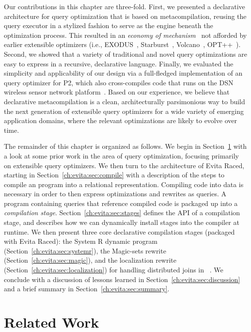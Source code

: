 Our contributions in this chapter are three-fold.  First, we presented a declarative
architecture for query optimization that is based on metacompilation, reusing
the query executor in a stylized fashion to serve as the engine beneath the
optimization process.  This resulted in an {\em economy of
mechanism}~\cite{Saltzer75theprotection} not afforded by earlier extensible
optimizers (i.e., EXODUS~\cite{exodus}, Starburst~\cite{phh92},
Volcano~\cite{volcano}, OPT++~\cite{opt++}).  Second, we showed that a variety
of traditional and novel query optimizations are easy to express in a
recursive, declarative language.  Finally, we evaluated the simplicity and
applicability of our design via a full-fledged implementation of an \OVERLOG
query optimizer for P2, which also cross-compiles code that runs on the DSN
wireless sensor network platform~\cite{chu-sensys07}.  Based on our experience,
we believe that declarative metacompilation is a clean, architecturally
parsimonious way to build the next generation of extensible query optimizers
for a wide variety of emerging application domains, where the relevant
optimizations are likely to evolve over time.

The remainder of this chapter is organized as follows.  We begin in
Section~\ref{ch:evita:sec:related} with a look at some prior work in the area
of query optimization, focusing primarily on extensible query optimizers.  We
then turn to the architecture of Evita Raced, starting in
Section~\ref{ch:evita:sec:compile} with a description of the steps to compile
an \OVERLOG program into a relational representation.  Compiling code into data
is necessary in order to then express optimizations and rewrites as queries.  A
program containing queries that reference compiled code is packaged up into a
{\em compilation stage}.  Section~\ref{ch:evita:sec:stages} defines the API of
a compilation stage, and describes how we can dynamically install stages into
the compiler at runtime.  We then present three core declarative compilation
stages (packaged with Evita Raced): the System R dynamic program
(Section~\ref{ch:evita:sec:systemr}), the Magic-sets rewrite
(Section~\ref{ch:evita:sec:magic}), and the localization rewrite
(Section~\ref{ch:evita:sec:localization}) for handling distributed joins in
\OVERLOG~\cite{loo-sigmod06}.  We conclude with a discussion of lessons learned
in Section~\ref{ch:evita:sec:discussion} and a brief summary in
Section~\ref{ch:evita:sec:summary}.


\section{Related Work}
\label{ch:evita:sec:related}

